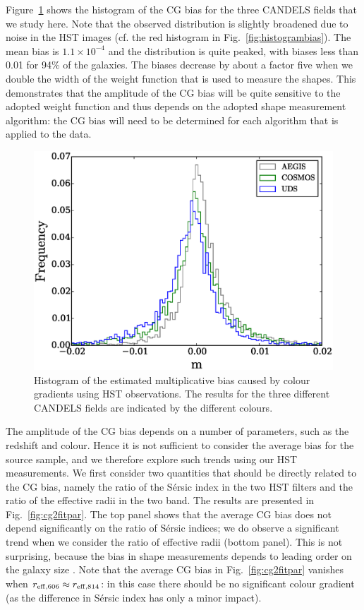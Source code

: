 \documentclass[useAMS,usenatbib]{mnras}
\begin{document}
Figure~\ref{fig:cgbhis} shows the histogram of the CG bias for the three CANDELS fields that we study here.
Note that the observed distribution is slightly broadened due to noise in the HST images (cf. the red histogram in Fig.~\ref{fig:histogrambias}). The mean bias is $1.1\times 10^{-4}$ and the distribution is quite peaked, with biases less than 0.01 for 94\% of the galaxies.  The biases decrease by about a factor five when we double the width of the weight function that is used to measure the shapes. This demonstrates that the amplitude of the CG bias will be quite sensitive to the adopted weight function and thus depends on the adopted shape measurement algorithm: the CG bias will need to be determined for each algorithm that is applied to the data.

%
\begin{figure}
  \includegraphics[width=\hsize]{zhiscgb.eps}
\caption{Histogram of the estimated multiplicative bias caused by colour gradients using HST
observations. The results for the three different CANDELS fields are indicated by the different
colours.}
\label{fig:cgbhis}
\end{figure}

The amplitude of the CG bias depends on a number of parameters, such as the redshift and colour. Hence it is not sufficient to consider the average bias for the source sample, and we therefore explore such trends using our HST measurements. We first consider two quantities that should be directly related to
the CG bias, namely the ratio of the S{\'e}rsic index in the two HST filters and the ratio of the effective
radii in the two band. The results are presented in Fig.~\ref{fig:cg2fitpar}. The top panel shows that the
average CG bias does not depend significantly on the ratio of S{\'e}rsic indices; we do observe a significant trend when we consider the ratio of effective radii (bottom panel). This is not surprising, because the bias in shape measurements depends to leading order on the galaxy size \citep{Massey13}. Note that the average CG bias in Fig.~\ref{fig:cg2fitpar} vanishes  when $r_{\rm eff,606}\approx r_{\rm eff, 814}$: in this case there should be no significant colour gradient (as the difference in S{\'e}rsic index has only a minor impact).
\end{document}
